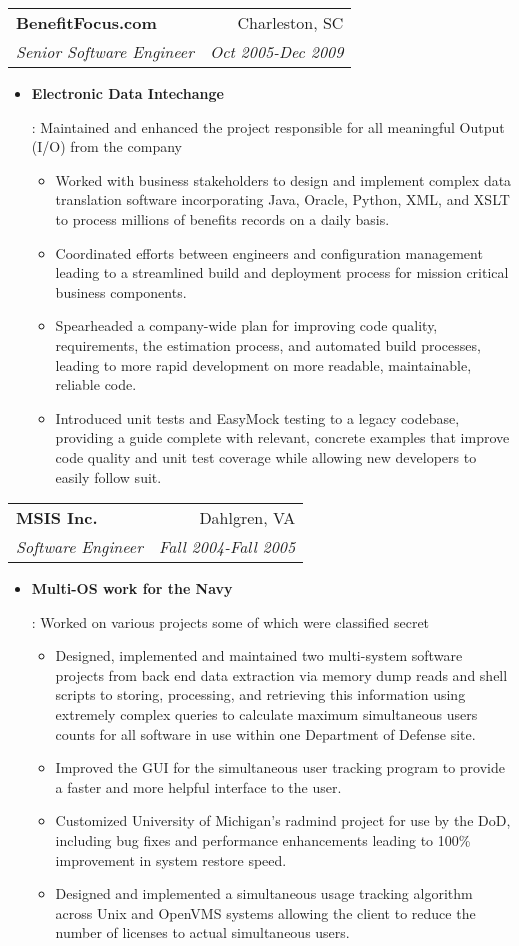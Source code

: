 \documentclass[letterpaper,10pt]{article}
\makeatletter
\newcommand{\resumeItem}[2]{
  \item\small{
    \textbf{#1}{: #2 \vspace{-2pt}}
  }
}
\newcommand{\resumeSubheading}[4]{
  \vspace{-1pt}\item[]
  \begin{tabular*}{0.98\textwidth}{l@{\extracolsep{\fill}}r}
      \hspace{-10pt}\textbf{#1} & #2 \\
      \hspace{-10pt}\textit{\small#3} & \textit{\small #4} \\
    \end{tabular*}\vspace{-5pt}
}
\newcommand{\resumeItemListStart}{\begin{itemize}}
\newcommand{\resumeItemListEnd}{\end{itemize}\vspace{-5pt}}
\makeatother
\begin{document}
    \resumeSubheading
      {BenefitFocus.com}{Charleston, SC}
      {Senior Software Engineer}{Oct 2005-Dec 2009}
      \resumeItemListStart
        \resumeItem{Electronic Data Intechange}
          {Maintained and enhanced the project responsible for all meaningful Output (I/O) from the company
            \begin{itemize}
                \item Worked with business stakeholders to design and implement complex data translation software incorporating Java, Oracle, Python, XML, and XSLT to process millions of benefits records on a daily basis.
                \item Coordinated efforts between engineers and configuration management leading to a streamlined build and deployment process for mission critical business components.
                \item Spearheaded a company-wide plan for improving code quality, requirements, the estimation process, and automated build processes, leading to more rapid development on more readable, maintainable, reliable code.
                \item  Introduced unit tests and EasyMock testing to a legacy codebase, providing a guide complete with relevant, concrete examples that improve code quality and unit test coverage while allowing new developers to easily follow suit.
            \end{itemize}}
      \resumeItemListEnd

\resumeSubheading
  {MSIS Inc.}{Dahlgren, VA}
  {Software Engineer}{Fall 2004-Fall 2005}
  \resumeItemListStart
    \resumeItem{Multi-OS work for the Navy}
      {Worked on various projects some of which were classified secret
        \begin{itemize}
            \item Designed, implemented and maintained two multi-system software projects from back end data extraction via memory dump reads and shell scripts to storing, processing, and retrieving this information using extremely complex queries to calculate maximum simultaneous users counts for all software in use within one Department of Defense site.
            \item Improved the GUI for the simultaneous user tracking program to provide a faster and more helpful interface to the user.
            \item Customized University of Michigan's radmind project for use by the DoD, including bug fixes and performance enhancements leading to 100\% improvement in system restore speed.
            \item Designed and implemented a simultaneous usage tracking algorithm across Unix and OpenVMS systems allowing the client to reduce the number of licenses to actual simultaneous users.
        \end{itemize}}
  \resumeItemListEnd
\end{document}
